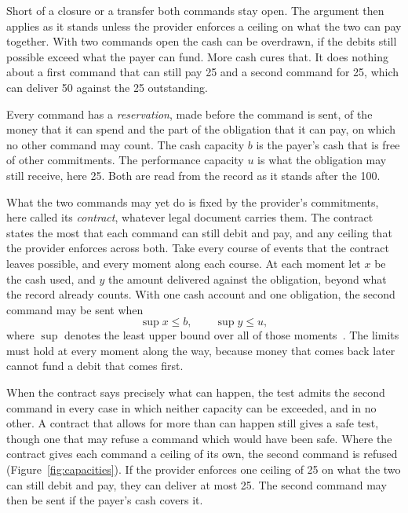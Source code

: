\documentclass{momentum}
\begin{document}
Short of a closure or a transfer both commands stay open. The argument then applies as it stands unless the provider enforces a ceiling on what the two can pay together. With two commands open the cash can be overdrawn, if the debits still possible exceed what the payer can fund. More cash cures that. It does nothing about a first command that can still pay 25 and a second command for 25, which can deliver 50 against the 25 outstanding.

Every command has a \emph{reservation}, made before the command is sent, of the money that it can spend and the part of the obligation that it can pay, on which no other command may count. The cash capacity $b$ is the payer's cash that is free of other commitments. The performance capacity $u$ is what the obligation may still receive, here 25. Both are read from the record as it stands after the 100.

What the two commands may yet do is fixed by the provider's commitments, here called its \emph{contract}, whatever legal document carries them. The contract states the most that each command can still debit and pay, and any ceiling that the provider enforces across both. Take every course of events that the contract leaves possible, and every moment along each course. At each moment let $x$ be the cash used, and $y$ the amount delivered against the obligation, beyond what the record already counts. With one cash account and one obligation, the second command may be sent when
\[
 \sup x\le b,\qquad \sup y\le u,
\]
where $\sup$ denotes the least upper bound over all of those moments~\cite[Section~5.2]{aot}. The limits must hold at every moment along the way, because money that comes back later cannot fund a debit that comes first.

When the contract says precisely what can happen, the test admits the second command in every case in which neither capacity can be exceeded, and in no other. A contract that allows for more than can happen still gives a safe test, though one that may refuse a command which would have been safe. Where the contract gives each command a ceiling of its own, the second command is refused (Figure~\ref{fig:capacities}). If the provider enforces one ceiling of 25 on what the two can still debit and pay, they can deliver at most 25. The second command may then be sent if the payer's cash covers it.
\end{document}

